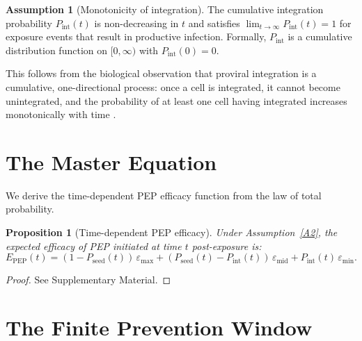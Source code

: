 \documentclass[12pt,a4paper]{article}
\theoremstyle{plain}
\newtheorem{proposition}[theorem]{Proposition}
\theoremstyle{definition}
\newtheorem{assumption}{Assumption}
\theoremstyle{remark}
\newcommand{\Pint}{P_{\mathrm{int}}}
\newcommand{\Pseed}{P_{\mathrm{seed}}}
\newcommand{\Epep}{E_{\mathrm{PEP}}}
\begin{document}
\begin{assumption}[Monotonicity of integration]\label{A3}
The cumulative integration probability $\Pint(t)$ is non-decreasing in $t$ and satisfies $\lim_{t \to \infty} \Pint(t) = 1$ for exposure events that result in productive infection. Formally, $\Pint$ is a cumulative distribution function on $[0, \infty)$ with $\Pint(0) = 0$.
\end{assumption}

This follows from the biological observation that proviral integration is a cumulative, one-directional process: once a cell is integrated, it cannot become unintegrated, and the probability of at least one cell having integrated increases monotonically with time \citep{ref:McMichael2010}.


\section{The Master Equation}\label{sec:master}

We derive the time-dependent PEP efficacy function from the law of total probability.

\begin{proposition}[Time-dependent PEP efficacy]\label{prop:master}
Under Assumption~\ref{A2}, the expected efficacy of PEP initiated at time $t$ post-exposure is:
\begin{equation}\label{eq:master}
    \Epep(t) = (1 - \Pseed(t))\,\varepsilon_{\max} + (\Pseed(t) - \Pint(t))\,\varepsilon_{\mathrm{mid}} + \Pint(t)\,\varepsilon_{\min}.
\end{equation}
\end{proposition}

\begin{proof}
See Supplementary Material.
\end{proof}





\section{The Finite Prevention Window}\label{sec:theorem}
\end{document}
